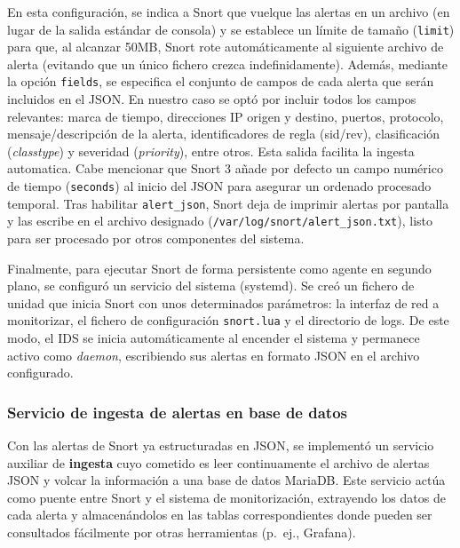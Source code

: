 \documentclass[11pt,a4paper,twoside]{report}
\begin{document}
En esta configuración, se indica a Snort que vuelque las alertas en un archivo (en lugar de la salida estándar de consola) y se establece un límite de tamaño (\texttt{limit}) para que, al alcanzar 50MB, Snort rote automáticamente al siguiente archivo de alerta (evitando que un único fichero crezca indefinidamente). Además, mediante la opción \texttt{fields}, se especifica el conjunto de campos de cada alerta que serán incluidos en el JSON. En nuestro caso se optó por incluir todos los campos relevantes: marca de tiempo, direcciones IP origen y destino, puertos, protocolo, mensaje/descripción de la alerta, identificadores de regla (sid/rev), clasificación (\textit{classtype}) y severidad (\textit{priority}), entre otros. Esta salida facilita la ingesta automatica. Cabe mencionar que Snort 3 añade por defecto un campo numérico de tiempo (\texttt{seconds}) al inicio del JSON para asegurar un ordenado procesado temporal. Tras habilitar \texttt{alert\_json}, Snort deja de imprimir alertas por pantalla y las escribe en el archivo designado (\texttt{/var/log/snort/alert\_json.txt}), listo para ser procesado por otros componentes del sistema.\newline

Finalmente, para ejecutar Snort de forma persistente como agente en segundo plano, se configuró un servicio del sistema (systemd). Se creó un fichero de unidad  que inicia Snort con unos determinados parámetros: la interfaz de red a monitorizar, el fichero de configuración \texttt{snort.lua} y el directorio de logs. De este modo, el IDS se inicia automáticamente al encender el sistema y permanece activo como \textit{daemon}, escribiendo sus alertas en formato JSON en el archivo configurado.

\subsubsection{Servicio de ingesta de alertas en base de datos}

Con las alertas de Snort ya estructuradas en JSON, se implementó un servicio auxiliar de \textbf{ingesta} cuyo cometido es leer continuamente el archivo de alertas JSON y volcar la información a una base de datos MariaDB. Este servicio actúa como puente entre Snort y el sistema de monitorización, extrayendo los datos de cada alerta y almacenándolos en las tablas correspondientes donde pueden ser consultados fácilmente por otras herramientas (p.~ej., Grafana).\newline
\end{document}
